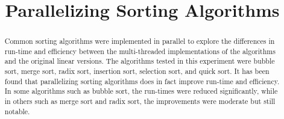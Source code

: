 \documentclass[conference]{IEEEtran}
\begin{document}
\title{Parallelizing Sorting Algorithms}

\author{
\and
{}
\and
{}
\and
{}
\and
{}
}

\maketitle

\begin{abstract}
Common sorting algorithms were implemented in parallel to explore the differences in run-time and efficiency between the multi-threaded implementations of the algorithms and the original linear versions. The algorithms tested in this experiment were bubble sort, merge sort, radix sort, insertion sort, selection sort, and quick sort. It has been found that parallelizing sorting algorithms does in fact improve run-time and efficiency. In some algorithms such as bubble sort, the run-times were reduced significantly, while in others such as merge sort and radix sort, the improvements were moderate but still notable.
\end{abstract}
\end{document}
